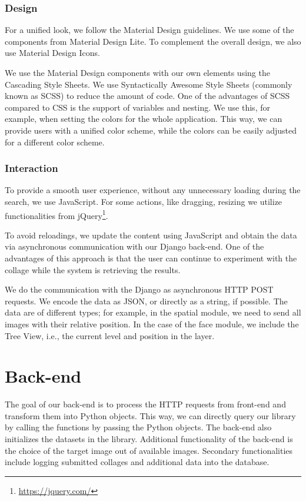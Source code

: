 \subsubsection*{Design}
For a unified look, we follow the Material Design guidelines. We use some of the components from Material Design Lite. To complement the overall design, we also use Material Design Icons.

We use the Material Design components with our own elements using the Cascading Style Sheets. We use Syntactically Awesome Style Sheets (commonly known as SCSS) to reduce the amount of code. One of the advantages of SCSS compared to CSS is the support of variables and nesting. We use this, for example, when setting the colors for the whole application. This way, we can provide users with a unified color scheme, while the colors can be easily adjusted for a different color scheme.

\subsubsection*{Interaction}

To provide a smooth user experience, without any unnecessary loading during the search, we use JavaScript. For some actions, like dragging, resizing we utilize functionalities from jQuery\footnote{\url{https://jquery.com/}}. 

To avoid reloadings, we update the content using JavaScript and obtain the data via asynchronous communication with our Django back-end. One of the advantages of this approach is that the user can continue to experiment with the collage while the system is retrieving the results.

We do the communication with the Django as asynchronous HTTP POST requests. We encode the data as JSON, or directly as a string, if possible. The data are of different types; for example, in the spatial module, we need to send all images with their relative position. In the case of the face module, we include the Tree View, i.e., the current level and position in the layer.

\section{Back-end}

The goal of our back-end is to process the HTTP requests from front-end and transform them into Python objects. This way, we can directly query our library by calling the functions by passing the Python objects. The back-end also initializes the datasets in the library. Additional functionality of the back-end is the choice of the target image out of available images. Secondary functionalities include logging submitted collages and additional data into the database.


